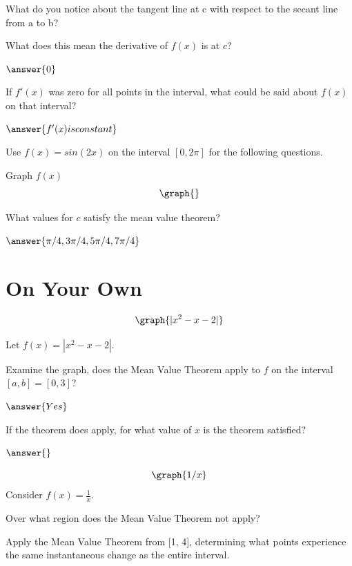 \documentclass{ximera}
\begin{document}
\begin{question}
What do you notice about the tangent line at c with respect to the secant line from a to b?

\begin{freeResponse}
\end{freeResponse}

What does this mean the derivative of $f(x)$ is at $c$?

$\answer{0}$

If $f'(x)$ was zero for all points in the interval, what could be said about $f(x)$ on that interval?

$\answer{f'(x) is constant}$
\end{question}
\begin{question}
Use $f(x)=sin(2x)$ on the interval $[0,2\pi]$ for the following questions.

Graph $f(x)$
\[
\graph{}
\]

What values for $c$ satisfy the mean value theorem?

$\answer{\pi/4,3\pi/4,5\pi/4, 7\pi/4}$
\end{question}

\section{On Your Own}

\[
\graph{|x^2-x-2|}
\]

Let $f(x)=\left|x^2-x-2\right|$.

\begin{question}
Examine the graph, does the Mean Value Theorem apply to $f$ on the interval $[a,b]=[0,3]$?

$\answer{Yes}$

If the theorem does apply, for what value of $x$ is the theorem satisfied?

$\answer{}$
\end{question}

\begin{question}
\[
\graph{1/x}
\]
Consider $f(x) = \frac{1}{x}$.

Over what region does the Mean Value Theorem not apply?

\begin{freeResponse}
\end{freeResponse}

Apply the Mean Value Theorem from [1, 4], determining what points experience the same instantaneous change as the entire interval.
\begin{freeResponse}
\end{freeResponse}
\end{question}
\end{document}
